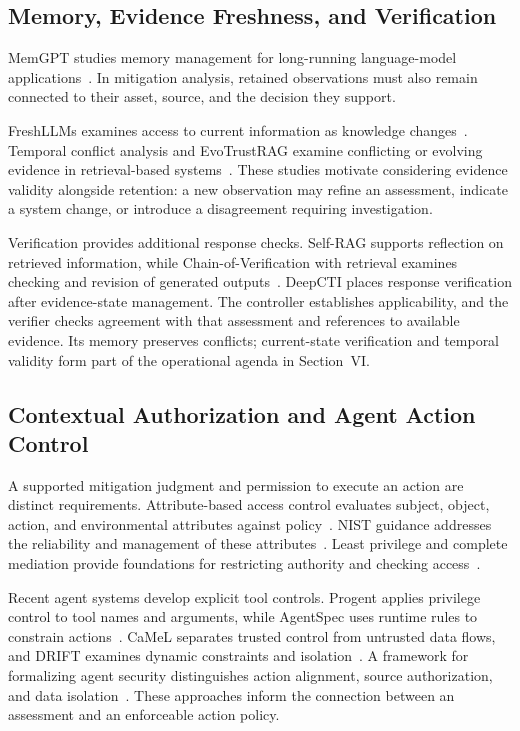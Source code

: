 \documentclass[conference]{IEEEtran}
\begin{document}
\subsection{Memory, Evidence Freshness, and Verification}

MemGPT studies memory management for long-running language-model
applications~\cite{packer2023memgpt}. In mitigation analysis, retained
observations must also remain connected to their asset, source, and
the decision they support.

FreshLLMs examines access to current information as knowledge
changes~\cite{vu2024freshllms}. Temporal conflict analysis and EvoTrustRAG
examine conflicting or evolving evidence in retrieval-based
systems~\cite{ozer2025temporalconflict,nie2026evotrustrag}.
These studies motivate considering evidence validity alongside
retention: a new observation may refine an assessment, indicate a
system change, or introduce a disagreement requiring investigation.

Verification provides additional response checks. Self-RAG supports
reflection on retrieved information, while Chain-of-Verification with
retrieval examines checking and revision of generated
outputs~\cite{asai2024selfrag,he2024covrag}. DeepCTI places response
verification after evidence-state management. The controller establishes
applicability, and the verifier checks agreement with that assessment
and references to available evidence. Its memory preserves conflicts;
current-state verification and temporal validity form part of the
operational agenda in Section~VI.

\subsection{Contextual Authorization and Agent Action Control}

A supported mitigation judgment and permission to execute an action
are distinct requirements. Attribute-based access control evaluates
subject, object, action, and environmental attributes against
policy~\cite{hu2014abac}. NIST guidance addresses the reliability and
management of these attributes~\cite{hu2019attributes}. Least privilege
and complete mediation provide foundations for restricting authority
and checking access~\cite{saltzer1975protection}.

Recent agent systems develop explicit tool controls. Progent applies
privilege control to tool names and arguments, while AgentSpec uses
runtime rules to constrain actions~\cite{shi2025progent,wang2026agentspec}.
CaMeL separates trusted control from untrusted data flows, and DRIFT
examines dynamic constraints and isolation~\cite{debenedetti2025camel,li2025drift}.
A framework for formalizing agent security distinguishes action
alignment, source authorization, and data isolation~\cite{siu2026agentsecurity}.
These approaches inform the connection between an assessment and
an enforceable action policy.
\end{document}
